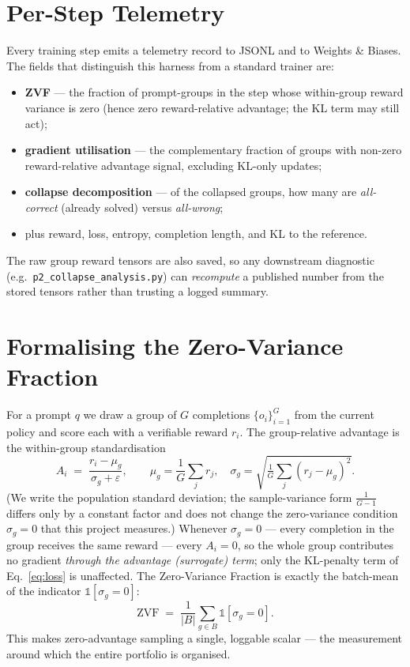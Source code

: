 \documentclass[12pt,a4paper]{report}
\newcommand{\zvf}{\mathrm{ZVF}}
\begin{document}
\section{Per-Step Telemetry}
\label{sec:telemetry}
Every training step emits a telemetry record to JSONL and to Weights \& Biases. The
fields that distinguish this harness from a standard trainer are:
\begin{itemize}[leftmargin=1.4em,itemsep=1pt]
  \item \textbf{ZVF} --- the fraction of prompt-groups in the step whose within-group
  reward variance is zero (hence zero reward-relative advantage; the KL term may
  still act);
  \item \textbf{gradient utilisation} --- the complementary fraction of groups
  with non-zero reward-relative advantage signal, excluding KL-only updates;
  \item \textbf{collapse decomposition} --- of the collapsed groups, how many are
  \emph{all-correct} (already solved) versus \emph{all-wrong};
  \item plus reward, loss, entropy, completion length, and KL to the reference.
\end{itemize}
The raw group reward tensors are also saved, so any downstream diagnostic (e.g.\
\texttt{p2\_collapse\_analysis.py}) can \emph{recompute} a published number from the
stored tensors rather than trusting a logged summary.

\section{Formalising the Zero-Variance Fraction}
For a prompt $q$ we draw a group of $G$ completions $\{o_i\}_{i=1}^{G}$ from the
current policy and score each with a verifiable reward $r_i$. The group-relative
advantage is the within-group standardisation
\begin{equation}
A_i \;=\; \frac{r_i - \mu_g}{\sigma_g + \varepsilon},
\qquad
\mu_g = \frac{1}{G}\sum_{j} r_j,\quad
\sigma_g = \sqrt{\tfrac{1}{G}\sum_j (r_j-\mu_g)^2}.
\label{eq:adv}
\end{equation}
(We write the population standard deviation; the sample-variance form $\tfrac{1}{G-1}$
differs only by a constant factor and does not change the zero-variance condition
$\sigma_g=0$ that this project measures.) Whenever $\sigma_g = 0$ --- every completion in the group receives the same reward ---
every $A_i = 0$, so the whole group contributes no gradient \emph{through the
advantage (surrogate) term}; only the KL-penalty term of Eq.~\eqref{eq:loss} is
unaffected. The Zero-Variance
Fraction is exactly the batch-mean of the indicator $\mathbb{1}[\sigma_g = 0]$:
\begin{equation}
\zvf \;=\; \frac{1}{|B|}\sum_{g \in B} \mathbb{1}\!\left[\sigma_g = 0\right].
\label{eq:zvf}
\end{equation}
This makes zero-advantage sampling a single, loggable scalar --- the measurement around
which the entire portfolio is organised.
\end{document}
